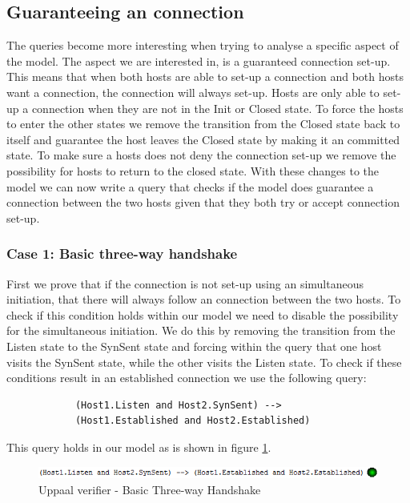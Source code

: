\documentclass[twocolumn]{article}
\begin{document}
	\subsection{Guaranteeing an connection} %
	\label{sub:guaranteeing_an_connection}
		The queries become more interesting when trying to analyse a specific aspect of the model. The aspect we are interested in, is a guaranteed connection set-up. This means that when both hosts are able to set-up a connection and both hosts want a connection, the connection will always set-up. Hosts are only able to set-up a connection when they are not in the Init or Closed state. To force the hosts to enter the other states we remove the transition from the Closed state back to itself and guarantee the host leaves the Closed state by making it an committed state. To make sure a hosts does not deny the connection set-up we remove the possibility for hosts to return to the closed state. With these changes to the model we can now write a query that checks if the model does guarantee a connection between the two hosts given that they both try or accept connection set-up.

		\subsubsection{Case 1: Basic three-way handshake}
		First we prove that if the connection is not set-up using an simultaneous initiation, that there will always follow an connection between the two hosts. To check if this condition holds within our model we need to disable the possibility for the simultaneous initiation. We do this by removing the transition from the Listen state to the SynSent state and forcing within the query that one host visits the SynSent state, while the other visits the Listen state. To check if these conditions result in an established connection we use the following query:
		\begin{verbatim}
			(Host1.Listen and Host2.SynSent) -->
			(Host1.Established and Host2.Established)
		\end{verbatim}
		This query holds in our model as is shown in figure \ref{fig:verifier2}.
		\begin{figure}[h!]
			\begin{center}
				\includegraphics[width=\linewidth]{verifier-listen.png}
			\end{center}
			\caption{Uppaal verifier - Basic Three-way Handshake}
			\label{fig:verifier2}
		\end{figure}
		
\end{document}
